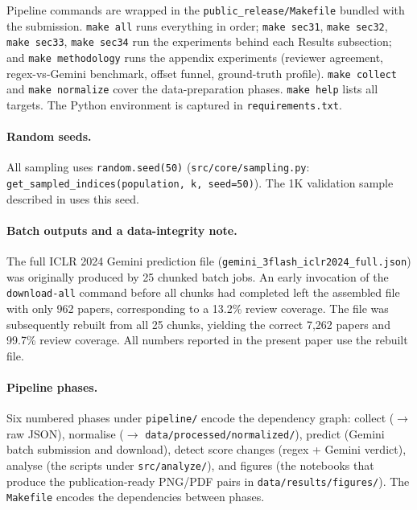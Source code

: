 \documentclass{article}
\newcommand{\code}[1]{\texttt{#1}}
\begin{document}
Pipeline commands are wrapped in the \code{public\_release/Makefile} bundled with the submission. \code{make all} runs everything in order; \code{make sec31}, \code{make sec32}, \code{make sec33}, \code{make sec34} run the experiments behind each Results subsection; and \code{make methodology} runs the appendix experiments (reviewer agreement, regex-vs-Gemini benchmark, offset funnel, ground-truth profile). \code{make collect} and \code{make normalize} cover the data-preparation phases. \code{make help} lists all targets. The Python environment is captured in \code{requirements.txt}.

\paragraph{Random seeds.}
All sampling uses \code{random.seed(50)} (\code{src/core/sampling.py}: \code{get\_sampled\_indices(population, k, seed=50)}). The 1K validation sample described in  uses this seed.

\paragraph{Batch outputs and a data-integrity note.}
The full ICLR 2024 Gemini prediction file (\code{gemini\_3flash\_iclr2024\_full.json}) was originally produced by 25 chunked batch jobs. An early invocation of the \code{download-all} command before all chunks had completed left the assembled file with only 962 papers, corresponding to a 13.2\% review coverage. The file was subsequently rebuilt from all 25 chunks, yielding the correct 7,262 papers and 99.7\% review coverage. All numbers reported in the present paper use the rebuilt file.

\paragraph{Pipeline phases.}
Six numbered phases under \code{pipeline/} encode the dependency graph: collect ($\to$ raw JSON), normalise ($\to$ \code{data/processed/normalized/}), predict (Gemini batch submission and download), detect score changes (regex + Gemini verdict), analyse (the scripts under \code{src/analyze/}), and figures (the notebooks that produce the publication-ready PNG/PDF pairs in \code{data/results/figures/}). The \code{Makefile} encodes the dependencies between phases.
\end{document}
